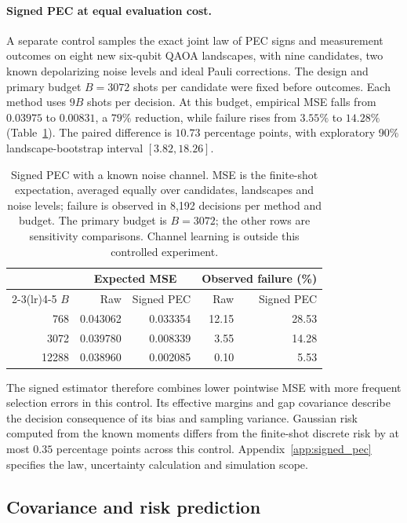 \documentclass[a4paper,onecolumn,unpublished,nopdfoutputerror]{quantumarticle}
\theoremstyle{plain}
\theoremstyle{definition}
\newcommand{\1}{\mathbf{1}}
\begin{document}
\paragraph{Signed PEC at equal evaluation cost.}
A separate control samples the exact joint law of PEC signs and measurement outcomes on eight new six-qubit QAOA landscapes, with nine candidates, two known depolarizing noise levels and ideal Pauli corrections. The design and primary budget $B=3072$ shots per candidate were fixed before outcomes. Each method uses $9B$ shots per decision. At this budget, empirical MSE falls from $0.03975$ to $0.00831$, a $79\%$ reduction, while failure rises from $3.55\%$ to $14.28\%$ (Table~\ref{tab:signed_pec}). The paired difference is $10.73$ percentage points, with exploratory 90\% landscape-bootstrap interval $[3.82,18.26]$.

\begin{table}[!ht]
\centering
\caption{Signed PEC with a known noise channel. MSE is the finite-shot expectation, averaged equally over candidates, landscapes and noise levels; failure is observed in 8,192 decisions per method and budget. The primary budget is $B=3072$; the other rows are sensitivity comparisons. Channel learning is outside this controlled experiment.}
\label{tab:signed_pec}
\begin{tabular}{rrrrr}
\toprule
& \multicolumn{2}{c}{Expected MSE} & \multicolumn{2}{c}{Observed failure (\%)}\\
\cmidrule(lr){2-3}\cmidrule(lr){4-5}
$B$ & Raw & Signed PEC & Raw & Signed PEC\\
\midrule
768 & 0.043062 & 0.033354 & 12.15 & 28.53\\
3072 & 0.039780 & 0.008339 & 3.55 & 14.28\\
12288 & 0.038960 & 0.002085 & 0.10 & 5.53\\
\bottomrule
\end{tabular}
\end{table}

The signed estimator therefore combines lower pointwise MSE with more frequent selection errors in this control. Its effective margins and gap covariance describe the decision consequence of its bias and sampling variance. Gaussian risk computed from the known moments differs from the finite-shot discrete risk by at most $0.35$ percentage points across this control. Appendix~\ref{app:signed_pec} specifies the law, uncertainty calculation and simulation scope.

\FloatBarrier
\subsection{Covariance and risk prediction}
\end{document}
